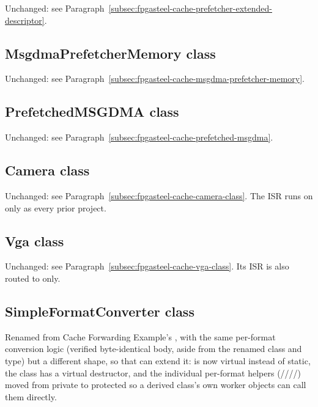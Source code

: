 Unchanged: see Paragraph~\ref{subsec:fpgasteel-cache-prefetcher-extended-descriptor}.

\subsection{MsgdmaPrefetcherMemory class}
\label{subsec:fpgasteel-dualcore-forwarding-msgdma-prefetcher-memory}

Unchanged: see Paragraph~\ref{subsec:fpgasteel-cache-msgdma-prefetcher-memory}.

\subsection{PrefetchedMSGDMA class}
\label{subsec:fpgasteel-dualcore-forwarding-prefetched-msgdma}

Unchanged: see Paragraph~\ref{subsec:fpgasteel-cache-prefetched-msgdma}.

\subsection{Camera class}
\label{subsec:fpgasteel-dualcore-forwarding-camera}

Unchanged: see Paragraph~\ref{subsec:fpgasteel-cache-camera-class}. The ISR runs on  only as every prior project.

\subsection{Vga class}
\label{subsec:fpgasteel-dualcore-forwarding-vga}

Unchanged: see Paragraph~\ref{subsec:fpgasteel-cache-vga-class}. Its ISR is also routed to  only.

\subsection{SimpleFormatConverter class}
\label{subsec:fpgasteel-dualcore-forwarding-simple-format-converter}

Renamed from Cache Forwarding Example's , with the same per-format conversion logic (verified byte-identical body, aside from the renamed class and  type) but a different shape, so that  can extend it:  is now virtual instead of static, the class has a virtual destructor, and the individual per-format helpers (////) moved from private to protected so a derived class's own worker objects can call them directly.

